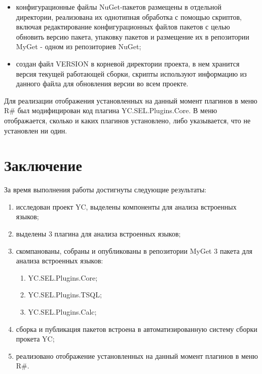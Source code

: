 \documentclass{matmex-diploma-custom}
\begin{document}
\begin{itemize}
\item
конфигурационные файлы NuGet-пакетов размещены в отдельной директории, реализована их однотипная обработка с помощью скриптов, включая редактирование конфигурационных файлов пакетов с целью обновить версию пакета, упаковку пакетов и размещение их в репозитории MyGet - одном из репозиториев NuGet;
\item
создан файл VERSION в корневой директории проекта, в нем хранится версия текущей работающей сборки, скрипты используют информацию из данного файла для обновления версии во всем проекте.
\end{itemize}

Для реализации отображения установленных на данный момент плагинов в меню R\# был модифицирован код плагина YC.SEL.Plugins.Core. В меню отображается, сколько и каких плагинов установлено, либо указывается, что не установлен ни один.


\section*{Заключение}

За время выполнения работы достигнуты следующие результаты:

\begin{enumerate}
\item
исследован проект YC, выделены компоненты для анализа встроенных языков;
\item
выделены 3 плагина для анализа встроенных языков;
\item
скомпанованы, собраны и опубликованы в репозитории MyGet 3 пакета для анализа встроенных языков:
\begin{enumerate}
\item
YC.SEL.Plugins.Core;
\item
YC.SEL.Plugins.TSQL;
\item
YC.SEL.Plugins.Calc;
\end{enumerate}
\item
сборка и публикация пакетов встроена в автоматизированную систему сборки прокета YC;
\item
реализовано отображение установленных на данный момент плагинов в меню R\#.
\end{enumerate}



\end{document}
